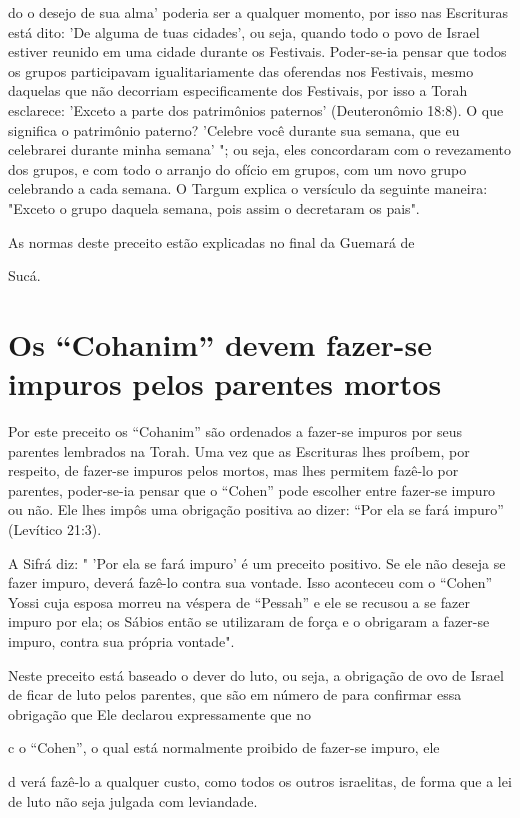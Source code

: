 do o desejo de sua alma' poderia ser a qualquer momento, por isso nas
Escritu­ras está dito: 'De alguma de tuas cidades', ou seja, quando todo
o povo de Is­rael estiver reunido em uma cidade durante os Festivais.
Poder-se-ia pensar que todos os grupos participavam igualitariamente das
oferendas nos Festivais, mes­mo daquelas que não decorriam
especificamente dos Festivais, por isso a To­rah esclarece: 'Exceto a
parte dos patrimônios paternos' (Deuteronômio 18:8). O que significa o
patrimônio paterno? 'Celebre você durante sua semana, que eu celebrarei
durante minha semana' "; ou seja, eles concordaram com o reve­zamento
dos grupos, e com todo o arranjo do ofício em grupos, com um novo grupo
celebrando a cada semana. O Targum explica o versículo da seguinte
ma­neira: "Exceto o grupo daquela semana, pois assim o decretaram os
pais".


As normas deste preceito estão explicadas no final da Guemará de


Sucá.

\section{Os ``Cohanim'' devem fazer-se impuros pelos parentes mortos}

Por este preceito os ``Cohanim'' são ordenados a fazer-se impuros por
seus parentes lembrados na Torah. Uma vez que as
Escrituras lhes proí­bem, por respeito, de fazer-se impuros pelos
mortos, mas lhes permitem fazê-lo por parentes, poder-se-ia pensar que o
``Cohen'' pode escolher entre fazer-se impuro ou não. Ele lhes impôs uma
obrigação positiva ao dizer: ``Por ela se fará impuro'' (Levítico 21:3).

A Sifrá diz: " 'Por ela se fará impuro' é um preceito positivo. Se ele
não deseja se fazer impuro, deverá fazê-lo contra sua vontade. Isso
aconteceu com o ``Cohen'' Yossi cuja esposa morreu na véspera de ``Pessah''
e ele se re­cusou a se fazer impuro por ela; os Sábios então se
utilizaram de força e o obri­garam a fazer-se impuro, contra sua própria
vontade".


Neste preceito está baseado o dever do luto, ou seja, a obrigação de ovo
de Israel de ficar de luto pelos parentes, que são em número de para
confirmar essa obrigação que Ele declarou expressamente que no


c o ``Cohen'', o qual está normalmente proibido de fazer-se impuro, ele

d verá fazê-lo a qualquer custo, como todos os outros israelitas, de
forma que a lei de luto não seja julgada com leviandade.

